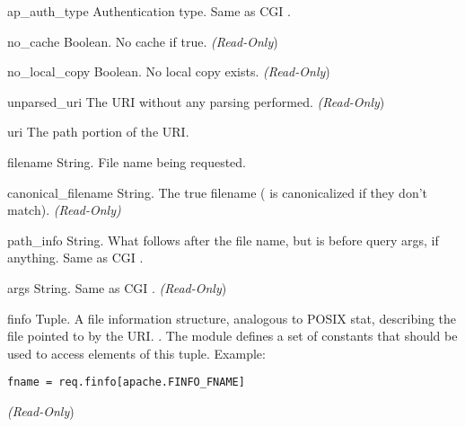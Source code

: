 \begin{memberdesc}[request]{ap_auth_type}
  Authentication type. Same as CGI .
\end{memberdesc}

\begin{memberdesc}[request]{no_cache}
  Boolean. No cache if true.
  \emph{(Read-Only})
\end{memberdesc}

\begin{memberdesc}[request]{no_local_copy}
  Boolean. No local copy exists.
  \emph{(Read-Only})
\end{memberdesc}

\begin{memberdesc}[request]{unparsed_uri}
  The URI without any parsing performed.
  \emph{(Read-Only})
\end{memberdesc}

\begin{memberdesc}[request]{uri}
  The path portion of the URI.
\end{memberdesc}

\begin{memberdesc}[request]{filename}
  String. File name being requested.
\end{memberdesc}

\begin{memberdesc}[request]{canonical_filename}
  String. The true filename ( is canonicalized if
  they don't match).  \emph{(Read-Only)}
\end{memberdesc}

\begin{memberdesc}[request]{path_info}
  String. What follows after the file name, but is before query args, if
  anything. Same as CGI .
\end{memberdesc}

\begin{memberdesc}[request]{args}
  String. Same as CGI .
  \emph{(Read-Only})
\end{memberdesc}

\begin{memberdesc}[request]{finfo}
  Tuple. A file information structure, analogous to POSIX stat,
  describing the file pointed to by the URI.  . The  module defines a set of 
  constants that should be used to access elements of this
  tuple. Example:
  \begin{verbatim}
fname = req.finfo[apache.FINFO_FNAME]
  \end{verbatim}
  \emph{(Read-Only})
\end{memberdesc}


